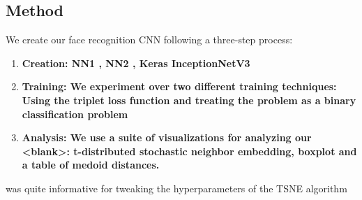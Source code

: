 \subsection{Method}

We create our face recognition CNN following a three-step process:
\begin{enumerate}
    \item \bf{Creation}: NN1 \cite[Table 1]{facenet}, NN2 \cite[Table 2]{facenet}, Keras InceptionNetV3
    \item \bf{Training}: We experiment over two different training techniques: Using the triplet loss function and treating the problem as a binary classification problem \cite{deepface}
    \item \bf{Analysis}: We use a suite of visualizations for analyzing our <blank>: t-distributed stochastic neighbor embedding, boxplot and a table of medoid distances. 
\end{enumerate}

\cite{tsne_how_to} was quite informative for tweaking the hyperparameters of the TSNE algorithm 